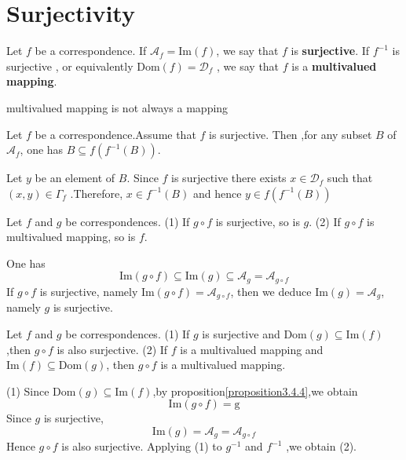 \documentclass{book}
\numberwithin{equation}{section}
\begin{document}
\section{Surjectivity}
\begin{definitionenv}
    Let $f$ be a correspondence. If $\mathscr{A}_f=\mathrm{Im}(f)$, we say that $f$ is \textbf{surjective}. If $f^{-1}$ is surjective , or equivalently $\mathrm{Dom}(f)=\mathscr{D}_f$ , we say that $f$ is a \textbf{multivalued mapping}.
\end{definitionenv}
\begin{remark}
    multivalued mapping is not always a mapping
\end{remark}
\begin{propositionenv}\label{proposition3.5.1}
    Let $f$ be a correspondence.Assume that $f$ is surjective. Then ,for any subset $B$ of $\mathscr{A}_f$, one has $B\subseteq f(f^{-1}(B))$.
\end{propositionenv}
\begin{proofenv}
    Let $y$ be an element of $B$. Since $f$ is surjective there exists $x\in \mathscr{D}_f$ such that $(x,y)\in \Gamma_f$ .Therefore, $x\in f^{-1}(B)$ and hence $y\in f(f^{-1}(B))$
\end{proofenv}
\begin{propositionenv}\label{proposition3.5.2}
    Let $f$ and $g$ be correspondences.
    \newline
    (1) If $g\circ f$ is surjective, so is $g$.
    \newline
    (2) If $g\circ f$ is multivalued mapping, so is $f$.
\end{propositionenv}
\begin{proofenv}
    One has 
    $$\mathrm{Im}(g\circ f)\subseteq \mathrm{Im}(g)\subseteq \mathscr{A}_g=\mathscr{A}_{g\circ f}$$
    If $g\circ f $ is surjective, namely $\mathrm{Im}(g\circ f )=\mathscr{A}_{g\circ f}$, then we deduce $\mathrm{Im}(g)=\mathscr{A}_g$, namely $g$ is surjective.
\end{proofenv}
\begin{propositionenv}\label{proposition3.5.3}
    Let $f$ and $g$ be correspondences.
    \newline
    (1) If $g$ is surjective and $\mathrm{Dom}(g)\subseteq \mathrm{Im}(f)$,then $g\circ f $ is also surjective.
    \newline
    (2) If $f$ is a multivalued mapping and $\mathrm{Im}(f)\subseteq \mathrm{Dom}(g)$, then $g\circ f $ is a multivalued mapping.
\end{propositionenv}
\begin{proofenv}
    (1) Since $\mathrm{Dom}(g)\subseteq \mathrm{Im}(f)$,by proposition\ref{proposition3.4.4},we obtain 
    $$\mathrm{Im}(g\circ f )=\mathrm{g}$$
    Since $g$ is surjective,
    $$\mathrm{Im}(g)=\mathscr{A}_g=\mathscr{A}_{g\circ f}$$
    Hence $g\circ f $ is also surjective.
    \newline
    Applying (1) to $g^{-1}$ and $f^{-1}$ ,we obtain (2).
\end{proofenv}
\end{document}

